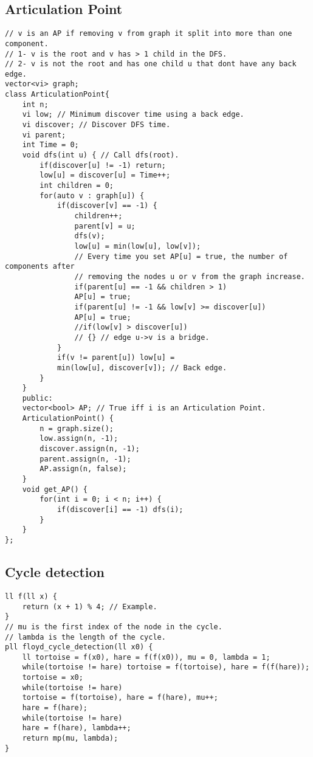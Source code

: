 \documentclass[a4paper]{article}
\begin{document}
\subsection*{Articulation Point}
\begin{multicols}{2}
\begin{verbatim}
// v is an AP if removing v from graph it split into more than one component.
// 1- v is the root and v has > 1 child in the DFS.
// 2- v is not the root and has one child u that dont have any back edge.
vector<vi> graph;
class ArticulationPoint{
    int n;
    vi low; // Minimum discover time using a back edge.
    vi discover; // Discover DFS time.
    vi parent;
    int Time = 0;
    void dfs(int u) { // Call dfs(root).
        if(discover[u] != -1) return;
        low[u] = discover[u] = Time++;
        int children = 0;
        for(auto v : graph[u]) {
            if(discover[v] == -1) {
                children++;
                parent[v] = u;
                dfs(v);
                low[u] = min(low[u], low[v]);
                // Every time you set AP[u] = true, the number of components after
                // removing the nodes u or v from the graph increase.
                if(parent[u] == -1 && children > 1) 
                AP[u] = true;
                if(parent[u] != -1 && low[v] >= discover[u]) 
                AP[u] = true;
                //if(low[v] > discover[u])
                // {} // edge u->v is a bridge.
            }
            if(v != parent[u]) low[u] = 
            min(low[u], discover[v]); // Back edge.
        }
    }
    public:
    vector<bool> AP; // True iff i is an Articulation Point.
    ArticulationPoint() {
        n = graph.size();
        low.assign(n, -1);
        discover.assign(n, -1);
        parent.assign(n, -1);
        AP.assign(n, false);
    }
    void get_AP() {
        for(int i = 0; i < n; i++) {
            if(discover[i] == -1) dfs(i);
        }
    }
};
\end{verbatim}
\end{multicols}
\subsection*{Cycle detection}
\begin{multicols}{2}
\begin{verbatim}
ll f(ll x) {
    return (x + 1) % 4; // Example.
}
// mu is the first index of the node in the cycle.
// lambda is the length of the cycle.
pll floyd_cycle_detection(ll x0) {
    ll tortoise = f(x0), hare = f(f(x0)), mu = 0, lambda = 1;
    while(tortoise != hare) tortoise = f(tortoise), hare = f(f(hare));
    tortoise = x0;
    while(tortoise != hare) 
    tortoise = f(tortoise), hare = f(hare), mu++;
    hare = f(hare);
    while(tortoise != hare)
    hare = f(hare), lambda++;
    return mp(mu, lambda);
}
\end{verbatim}
\end{multicols}
\end{document}
